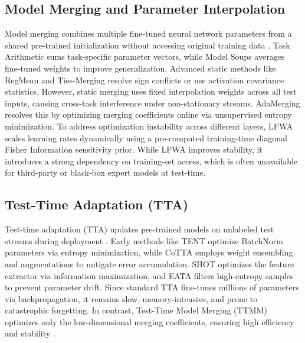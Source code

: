 \documentclass{article}
\theoremstyle{plain}
\theoremstyle{definition}
\theoremstyle{remark}
\begin{document}
\subsection{Model Merging and Parameter Interpolation}
Model merging combines multiple fine-tuned neural network parameters from a shared pre-trained initialization without accessing original training data \cite{wortsman22, ilharco23}. Task Arithmetic \cite{ilharco23} sums task-specific parameter vectors, while Model Soups \cite{wortsman22} averages fine-tuned weights to improve generalization. Advanced static methods like RegMean \cite{matena22} and Ties-Merging \cite{yadav23} resolve sign conflicts or use activation covariance statistics. However, static merging uses fixed interpolation weights across all test inputs, causing cross-task interference under non-stationary streams. AdaMerging \cite{yang24} resolves this by optimizing merging coefficients online via unsupervised entropy minimization. To address optimization instability across different layers, LFWA \cite{lfwa25} scales learning rates dynamically using a pre-computed training-time diagonal Fisher Information sensitivity prior. While LFWA improves stability, it introduces a strong dependency on training-set access, which is often unavailable for third-party or black-box expert models at test-time.

\subsection{Test-Time Adaptation (TTA)}
Test-time adaptation (TTA) updates pre-trained models on unlabeled test streams during deployment \cite{wang21, liang20, wang22}. Early methods like TENT \cite{wang21} optimize BatchNorm parameters \cite{ioffe15} via entropy minimization, while CoTTA \cite{wang22} employs weight ensembling and augmentations to mitigate error accumulation. SHOT \cite{liang20} optimizes the feature extractor via information maximization, and EATA \cite{chen22} filters high-entropy samples to prevent parameter drift. Since standard TTA fine-tunes millions of parameters via backpropagation, it remains slow, memory-intensive, and prone to catastrophic forgetting. In contrast, Test-Time Model Merging (TTMM) optimizes only the low-dimensional merging coefficients, ensuring high efficiency and stability \cite{choi24, jung25}.
\end{document}
